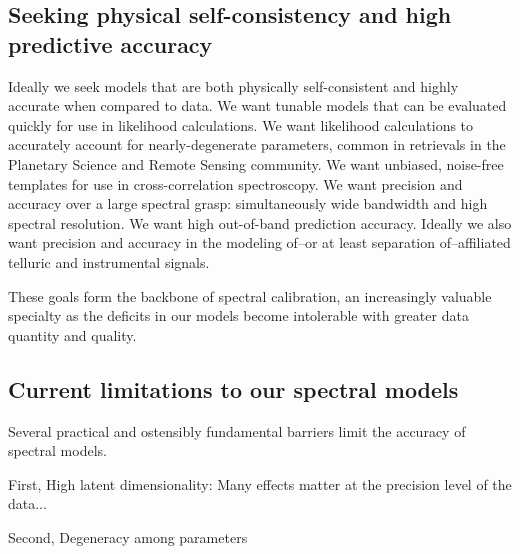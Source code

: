 \documentclass[modern]{aastex631}
\begin{document}
\subsection{Seeking physical self-consistency and high predictive accuracy}
Ideally we seek models that are both physically self-consistent and highly accurate when compared to data.  We want tunable models that can be evaluated quickly for use in likelihood calculations.  We want likelihood calculations to accurately account for nearly-degenerate parameters, common in retrievals in the Planetary Science and Remote Sensing community.  We want unbiased, noise-free templates for use in cross-correlation spectroscopy.  We want precision and accuracy over a large spectral grasp: simultaneously wide bandwidth and high spectral resolution.  We want high out-of-band prediction accuracy.  Ideally we also want precision and accuracy in the modeling of--or at least separation of--affiliated telluric and instrumental signals.

These goals form the backbone of spectral calibration, an increasingly valuable specialty as the deficits in our models become intolerable with greater data quantity and quality.

\subsection{Current limitations to our spectral models}

Several practical and ostensibly fundamental barriers limit the accuracy of spectral models.

First, High latent dimensionality: Many effects matter at the precision level of the data...

Second, Degeneracy among parameters
\end{document}
